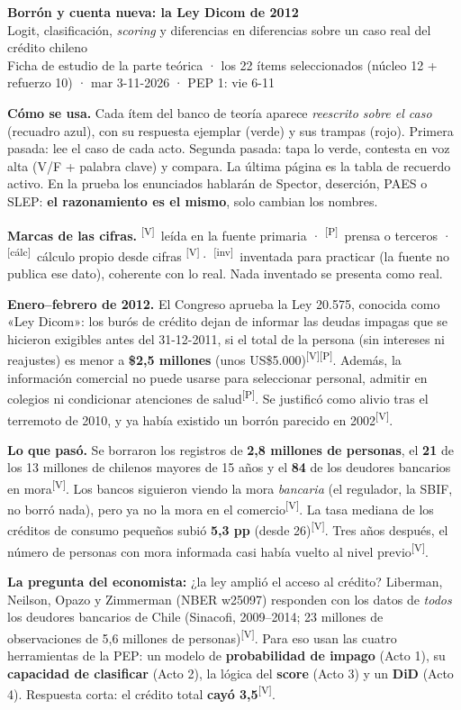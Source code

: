 \documentclass[10pt,a4paper]{article}
\newcommand{\V}{\textsuperscript{\textcolor{green!45!black}{[V]}}}
\newcommand{\Pre}{\textsuperscript{\textcolor{orange!80!black}{[P]}}}
\newcommand{\inv}{\textsuperscript{\textcolor{red!60!black}{[inv]}}}
\newcommand{\calc}{\textsuperscript{\textcolor{blue!60!black}{[cálc]}}}
\begin{document}
\renewcommand{\%}{\ifmmode\mbox{\char37}\else\char37\fi}

\begin{center}
{\LARGE\bfseries Borrón y cuenta nueva: la Ley Dicom de 2012}\\[3pt]
{\large Logit, clasificación, \emph{scoring} y diferencias en diferencias sobre un caso real del crédito chileno}\\[3pt]
\small Ficha de estudio de la parte teórica · los 22 ítems seleccionados (núcleo 12 + refuerzo 10) · mar 3-11-2026 · PEP 1: vie 6-11
\end{center}

\textbf{Cómo se usa.} Cada ítem del banco de teoría aparece \emph{reescrito sobre el caso} (recuadro azul), con su respuesta ejemplar (verde) y sus trampas (rojo). Primera pasada: lee el caso de cada acto. Segunda pasada: tapa lo verde, contesta en voz alta (V/F + palabra clave) y compara. La última página es la tabla de recuerdo activo. En la prueba los enunciados hablarán de Spector, deserción, PAES o SLEP: \textbf{el razonamiento es el mismo}, solo cambian los nombres.

\textbf{Marcas de las cifras.} \V\ leída en la fuente primaria · \Pre\ prensa o terceros · \calc\ cálculo propio desde cifras \V · \inv\ inventada para practicar (la fuente no publica ese dato), coherente con lo real. Nada inventado se presenta como real.

\begin{gancho}
\textbf{Enero--febrero de 2012.} El Congreso aprueba la Ley 20.575, conocida como «Ley Dicom»: los burós de crédito dejan de informar las deudas impagas que se hicieron exigibles antes del 31-12-2011, si el total de la persona (sin intereses ni reajustes) es menor a \textbf{\$2,5 millones} (unos US\$5.000)\V\Pre. Además, la información comercial no puede usarse para seleccionar personal, admitir en colegios ni condicionar atenciones de salud\Pre. Se justificó como alivio tras el terremoto de 2010, y ya había existido un borrón parecido en 2002\V.

\textbf{Lo que pasó.} Se borraron los registros de \textbf{2,8 millones de personas}, el \textbf{21\%} de los 13 millones de chilenos mayores de 15 años y el \textbf{84\%} de los deudores bancarios en mora\V. Los bancos siguieron viendo la mora \emph{bancaria} (el regulador, la SBIF, no borró nada), pero ya no la mora en el comercio\V. La tasa mediana de los créditos de consumo pequeños subió \textbf{5,3 pp} (desde 26\%)\V. Tres años después, el número de personas con mora informada casi había vuelto al nivel previo\V.

\textbf{La pregunta del economista:} ¿la ley amplió el acceso al crédito? Liberman, Neilson, Opazo y Zimmerman (NBER w25097) responden con los datos de \emph{todos} los deudores bancarios de Chile (Sinacofi, 2009--2014; 23 millones de observaciones de 5,6 millones de personas)\V. Para eso usan las cuatro herramientas de la PEP: un modelo de \textbf{probabilidad de impago} (Acto 1), su \textbf{capacidad de clasificar} (Acto 2), la lógica del \textbf{score} (Acto 3) y un \textbf{DiD} (Acto 4). Respuesta corta: el crédito total \textbf{cayó 3,5\%}\V.
\end{gancho}
\end{document}
